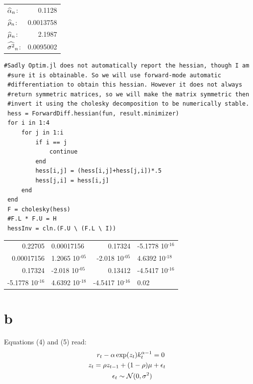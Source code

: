 \documentclass[12pt, letterpaper]{paper}
\begin{document}
\begin{center}
\begin{tabular}{lr}
\(\widehat{ \alpha }_{n}\): & 0.1128\\
\(\widehat{ \rho }_{n}\): & 0.0013758\\
\(\widehat{ \mu }_{n}\): & 2.1987\\
\(\widehat{ \sigma^{2} }_{n}\): & 0.0095002\\
\end{tabular}
\end{center}

\begin{verbatim}
#Sadly Optim.jl does not automatically report the hessian, though I am
 #sure it is obtainable. So we will use forward-mode automatic
 #differentiation to obtain this hessian. However it does not always
 #return symmetric matrices, so we will make the matrix symmetric then
 #invert it using the cholesky decomposition to be numerically stable.
 hess = ForwardDiff.hessian(fun, result.minimizer)
 for i in 1:4
     for j in 1:i
         if i == j
             continue
         end
         hess[i,j] = (hess[i,j]+hess[j,i])*.5
         hess[j,i] = hess[i,j]
     end
 end
 F = cholesky(hess)
 #F.L * F.U = H
 hessInv = cln.(F.U \ (F.L \ I))
\end{verbatim}

\begin{center}
\begin{tabular}{rlrl}
0.22705 & 0.00017156 & 0.17324 & -5.1778 \texttimes{} 10\(^{\text{-16}}\)\\
0.00017156 & 1.2065 \texttimes{} 10\(^{\text{-05}}\) & -2.018 \texttimes{} 10\(^{\text{-05}}\) & 4.6392 \texttimes{} 10\(^{\text{-18}}\)\\
0.17324 & -2.018 \texttimes{} 10\(^{\text{-05}}\) & 0.13412 & -4.5417 \texttimes{} 10\(^{\text{-16}}\)\\
-5.1778 \texttimes{} 10\(^{\text{-16}}\) & 4.6392 \texttimes{} 10\(^{\text{-18}}\) & -4.5417 \texttimes{} 10\(^{\text{-16}}\) & 0.02\\
\end{tabular}
\end{center}

\section{b}
\label{sec:orga026be5}

Equations (4) and (5) read:
\begin{align*}
  r_t - \alpha \exp( z_t ) k_t^{\alpha -1 } &= 0\\
  z_t = \rho z_{t-1} + (1-\rho)\mu &+ \epsilon_t\\
  \epsilon_t \sim \mathcal{N}( 0, \sigma^2)
\end{align*}
\end{document}
